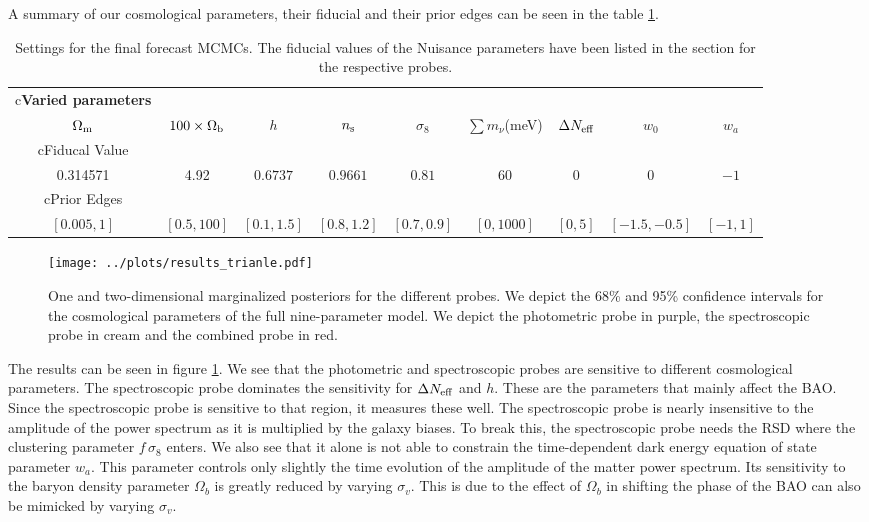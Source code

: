 \documentclass[../main.tex]{subfiles}
\begin{document}
A summary of our cosmological parameters, their fiducial and their prior edges can be seen in the table \ref{tab:fiducial_forecast}. 
\begin{table}[t]
    \renewcommand{\arraystretch}{1.2}
        \caption{Settings for the final forecast MCMCs. The fiducial values of the Nuisance parameters have been listed in the section for the respective probes. }
        \centering
        \begin{tabular}{ccccccccc}
        \hline
        \rowcolor{cyan} \multicolumn{9} {c}{{\bf{Varied parameters}}}\\ 
     \multicolumn{1}{c}{$\Omega_{\rm m}$} & \multicolumn{1}{c}{$100\times\Omega_{\rm b}$} & \multicolumn{1}{c}{$h$} & \multicolumn{1}{c}{$n_{\rm s}$} & \multicolumn{1}{c}{$\sigma_{8}$} & \multicolumn{1}{c}{$\sum m_\nu$(meV)} & \multicolumn{1}{c}{$\Delta N_\mathrm{eff}$} & \multicolumn{1}{c}{$w_0$} & \multicolumn{1}{c}{$w_a$} \\
      \hline
      \rowcolor{gray} \multicolumn{9} {c}{{{Fiducal Value}}}\\
            0.314571 & 4.92 & $0.6737$ & $0.9661$ & $0.81$ & $60$ & $0 $& $0$ & $-1$ \\
            \hline
            \rowcolor{gray} \multicolumn{9} {c}{{{Prior Edges}}}\\
            $[0.005,1]$&$[0.5,100]$&$[0.1,1.5]$&$[0.8,1.2]$&$[0.7,0.9]$&$[0,1000]$&$[0,5]$&$[-1.5,-0.5]$&$[-1,1]$
        \end{tabular}
        \label{tab:fiducial_forecast}
    \end{table}
    \begin{figure}
        \centering
        \caption{One and two-dimensional marginalized posteriors for the different \Euclid probes. We depict the 68\% and 95\% confidence intervals for the cosmological parameters of the full nine-parameter model. We depict the photometric probe in purple, the spectroscopic probe in cream and the combined probe in red.}
        \texttt{[image: ../plots/results\_trianle.pdf]}
        \label{fig:results_trianle}
    \end{figure}
    The results can be seen in figure \ref{fig:results_trianle}. We see that the photometric and spectroscopic probes are sensitive to different cosmological parameters. The spectroscopic probe dominates the sensitivity for $\Delta N_\mathrm{eff}$ and $h$. These are the parameters that mainly affect the BAO. Since the spectroscopic probe is sensitive to that region, it measures these well. The spectroscopic probe is nearly insensitive to the amplitude of the power spectrum as it is multiplied by the galaxy biases. To break this, the spectroscopic probe needs the RSD where the clustering parameter $f\,\sigma_8$ enters. We also see that it alone is not able to constrain the time-dependent dark energy equation of state parameter $w_a$. This parameter controls only slightly the time evolution of the amplitude of the matter power spectrum. Its sensitivity to the baryon density parameter $\Omega_b$ is greatly reduced by varying $\sigma_v$. This is due to the effect of $\Omega_b$ in shifting the phase of the BAO can also be mimicked by varying $\sigma_v$.\\
\end{document}
